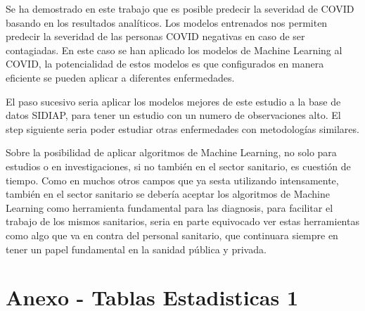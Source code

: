 \documentclass[
]{article}
\begin{document}
Se ha demostrado en este trabajo que es posible predecir la severidad de
COVID basando en los resultados analíticos. Los modelos entrenados nos
permiten predecir la severidad de las personas COVID negativas en caso
de ser contagiadas. En este caso se han aplicado los modelos de Machine
Learning al COVID, la potencialidad de estos modelos es que configurados
en manera eficiente se pueden aplicar a diferentes enfermedades.

El paso sucesivo seria aplicar los modelos mejores de este estudio a la
base de datos SIDIAP, para tener un estudio con un numero de
observaciones alto. El step siguiente seria poder estudiar otras
enfermedades con metodologías similares.

Sobre la posibilidad de aplicar algoritmos de Machine Learning, no solo
para estudios o en investigaciones, si no también en el sector
sanitario, es cuestión de tiempo. Como en muchos otros campos que ya
sesta utilizando intensamente, también en el sector sanitario se debería
aceptar los algoritmos de Machine Learning como herramienta fundamental
para las diagnosis, para facilitar el trabajo de los mismos sanitarios,
seria en parte equivocado ver estas herramientas como algo que va en
contra del personal sanitario, que continuara siempre en tener un papel
fundamental en la sanidad pública y privada.

\pagebreak

\hypertarget{anexo---tablas-estadisticas-1}{%
\section{Anexo - Tablas Estadisticas
1}\label{anexo---tablas-estadisticas-1}}
\end{document}
